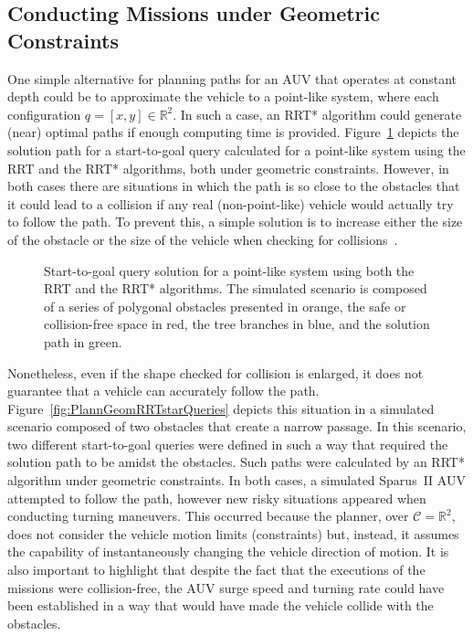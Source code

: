 \subsection{Conducting Missions under Geometric Constraints}

One simple alternative for planning paths for an \ac{AUV} that operates at
constant depth could be to approximate the vehicle to a point-like system, where
each configuration $q = [x,y] \in \mathbb{R}^2$. In such a case, an \ac{RRT*}
algorithm could generate (near) optimal paths if enough computing time is
provided. Figure~\ref{fig:PlannGeomConstr} depicts the solution path for a
start-to-goal query calculated for a point-like system using the \ac{RRT} and
the \ac{RRT*} algorithms, both under geometric constraints. However, in both
cases there are situations in which the path is so close to the obstacles that
it could lead to a collision if any real (non-point-like) vehicle would actually
try to follow the path. To prevent this, a simple solution is to increase either
the size of the obstacle or the size of the vehicle when checking for
collisions~\cite{Choset2005}.

\begin{figure}[htbp]
    \myfloatalign
    \quad
\caption[Comparison between start-to-goal query solutions obtained by an RRT and
an RRT* algorithms over a 2D workspace.]
{Start-to-goal query solution for a point-like system using both \protect
{} the \ac{RRT} and \protect
{} the \ac{RRT*} algorithms. The simulated
scenario is composed of a series of polygonal obstacles presented in orange, the
safe or collision-free space in red, the tree branches in blue, and the solution
path in green.}
\label{fig:PlannGeomConstr}
\end{figure}

Nonetheless, even if the shape checked for collision is enlarged, it does not
guarantee that a vehicle can accurately follow the path.
Figure~\ref{fig:PlannGeomRRTstarQueries} depicts this situation in a simulated
scenario composed of two obstacles that create a narrow passage. In this
scenario, two different start-to-goal queries were defined in such a way that
required the solution path to be amidst the obstacles. Such paths were
calculated by an \ac{RRT*} algorithm under geometric constraints. In both cases,
a simulated Sparus~II \ac{AUV} attempted to follow the path, however new risky
situations appeared when conducting turning maneuvers. This occurred because the
planner, over $\mathcal{C}=\mathbb{R}^2$, does not consider the vehicle motion
limits (constraints) but, instead, it assumes the capability of instantaneously
changing the vehicle direction of motion. It is also important to highlight that
despite the fact that the executions of the missions were collision-free, the
\ac{AUV} surge speed and turning rate could have been established in a way that
would have made the vehicle collide with the obstacles.

